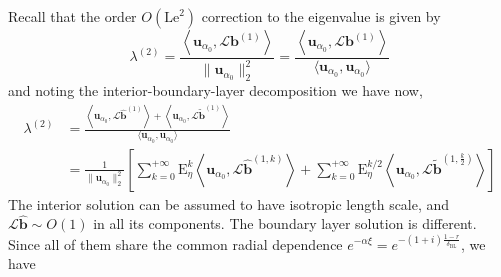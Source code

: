 Recall that the order $O(\mathrm{Le}^2)$ correction to the eigenvalue is given by
%
\begin{equation}
    \lambda^{(2)} = \frac{\left\langle \mathbf{u}_{\alpha_0}, \mathcal{L} \mathbf{b}^{(1)} \right\rangle}{\|\mathbf{u}_{\alpha_0}\|_2^2} = \frac{\left\langle \mathbf{u}_{\alpha_0}, \mathcal{L} \mathbf{b}^{(1)} \right\rangle}{\langle \mathbf{u}_{\alpha_0}, \mathbf{u}_{\alpha_0} \rangle}
\end{equation}
%
and noting the interior-boundary-layer decomposition we have now,
\begin{equation}
\begin{aligned}
    \lambda^{(2)} &= \frac{\left\langle \mathbf{u}_{\alpha_0}, \mathcal{L} \widehat{\mathbf{b}}^{(1)} \right\rangle + \left\langle \mathbf{u}_{\alpha_0}, \mathcal{L} \widetilde{\mathbf{b}}^{(1)} \right\rangle}{\langle \mathbf{u}_{\alpha_0}, \mathbf{u}_{\alpha_0} \rangle} \\ 
    &= \frac{1}{\|\mathbf{u}_{\alpha_0}\|_2^2} \left[\sum_{k=0}^{+\infty} \mathrm{E}_\eta^k \left\langle \mathbf{u}_{\alpha_0}, \mathcal{L}\widehat{\mathbf{b}}^{(1,k)} \right\rangle + \sum_{k=0}^{+\infty} \mathrm{E}_\eta^{k/2} \left\langle \mathbf{u}_{\alpha_0}, \mathcal{L}\widetilde{\mathbf{b}}^{(1,\frac{k}{2})} \right\rangle \right]
\end{aligned}
\end{equation}
%
The interior solution can be assumed to have isotropic length scale, and $\mathcal{L} \widehat{\mathbf{b}} \sim O(1)$ in all its components. The boundary layer solution is different. Since all of them share the common radial dependence $e^{-\alpha \xi} = e^{-(1 + i)\frac{1-r}{\delta_{\mathrm{BL}}}}$, we have
%
